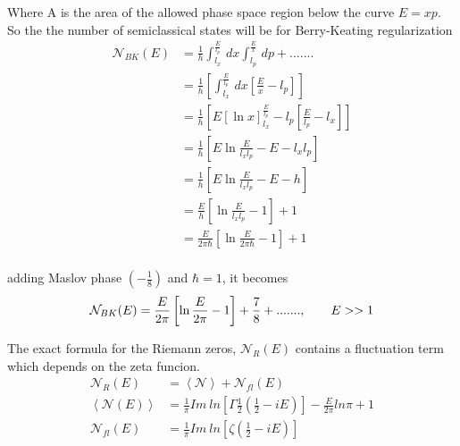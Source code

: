 \documentclass[12pt, letterpaper]{article}
\newcommand*{\1}{\hspace{1pt}}
\begin{document}
    Where A is the area of the allowed phase space region below the curve $E = xp$.
    So the the number of semiclassical states will be for Berry-Keating regularization 
    \begin{equation}
        \begin{split}
            \mathcal {N}_{BK}(E) &= \frac{1}{h}\int_{l_{x}}^{\frac{E}{l_{p}}}  \,dx \int_{l_{p}}^{\frac{E}{x}}  \,dp + ....... \\
            &= \frac{1}{h}\left[\int_{l_{x}}^{\frac{E}{l_{p}}}  \,dx \left[\frac{E}{x} - l_{p}\right] \right]  \\
            &= \frac{1}{h}\left[E\left[\ln x\right] ^{\frac{E}{l_{p}}} _{l_{x}} - l_{p}\left[\frac{E}{l_{p}} - l_{x}\right] \right]  \\
            &= \frac{1}{h}\left[E\ln \frac{E}{l_{x}l_{p}}  - E - l_{x}l_{p} \right]  \\
            &= \frac{1}{h}\left[E\ln \frac{E}{l_{x}l_{p}}  - E - h \right]  \\
            &= \frac{E}{h}\left[\ln \frac{E}{l_{x}l_{p}}  - 1 \right]  + 1 \\
            &= \frac{E}{2 \pi \hbar}\left[\ln \frac{E}{2 \pi \hbar}  - 1 \right]  + 1 \\
        \end{split}
    \end{equation}

    adding Maslov phase $(-\frac{1}{8})$ and $\hbar = 1$, it becomes 
    \begin{equation}
        \mathcal {N}_{BK}(E) = \frac{E}{2 \pi}\left[\ln \frac{E}{2\pi}  - 1 \right]  + \frac{7}{8} + .......,  \ \ \ \ \ \ E>>1\\
    \end{equation}

    The exact formula for the Riemann zeros, $\mathcal{N}_{R} (E)$ contains a fluctuation term which depends on the zeta funcion.\cite{s3}  
    \begin{equation}
        \begin{split}
            \mathcal{N}_{R} (E) &= \left\langle \mathcal{N}\right\rangle + \mathcal{N}_{fl} (E) \\
            \left\langle\mathcal{N} (E)\right\rangle &= \frac{1}{\pi} Im \ ln \left[\Gamma\frac{1}{2}\left(\frac{1}{2}-iE\right) \right] - \frac{E}{2 \pi} ln \pi + 1  \\
            \mathcal {N} _{fl} (E) &= \frac{1}{\pi} Im \ ln \left[\zeta\left(\frac{1}{2} - iE \right)\right]
        \end{split}
    \end{equation}
\end{document}

